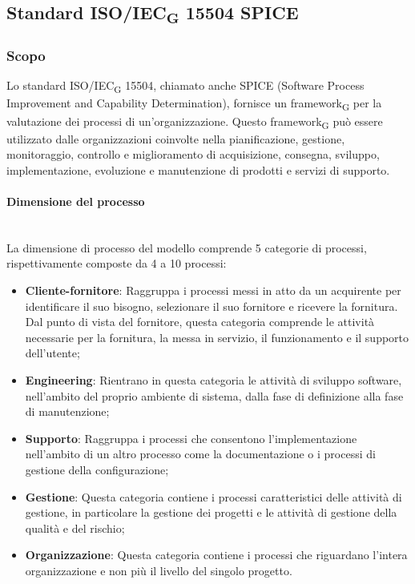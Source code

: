 \subsection{Standard ISO/IEC\textsubscript{G} 15504 SPICE}
\subsubsection{Scopo}
Lo standard ISO/IEC\textsubscript{G} 15504, chiamato anche SPICE (Software Process Improvement and Capability Determination), fornisce un framework\textsubscript{G} per la valutazione dei processi di un'organizzazione. Questo framework\textsubscript{G} può essere utilizzato dalle organizzazioni coinvolte nella pianificazione, gestione, monitoraggio, controllo e miglioramento di acquisizione, consegna, sviluppo, implementazione, evoluzione e manutenzione di prodotti e servizi di supporto.
\paragraph {Dimensione del processo}\mbox{}\\
La dimensione di processo del modello comprende 5 categorie di processi, rispettivamente composte da 4 a 10 processi:
\begin{itemize}
	\item \textbf{Cliente-fornitore}: Raggruppa i processi messi in atto da un acquirente per identificare il suo bisogno, selezionare il suo fornitore e ricevere la fornitura. Dal punto di vista del fornitore, questa categoria comprende le attività necessarie per la fornitura, la messa in servizio, il funzionamento e il supporto dell'utente;
	\item \textbf{Engineering}: Rientrano in questa categoria le attività di sviluppo software, nell'ambito del proprio ambiente di sistema, dalla fase di definizione alla fase di manutenzione;
	\item \textbf{Supporto}: Raggruppa i processi che consentono l'implementazione nell'ambito di un altro processo come la documentazione o i processi di gestione della configurazione;
	\item \textbf{Gestione}: Questa categoria contiene i processi caratteristici delle attività di gestione, in particolare la gestione dei progetti e le attività di gestione della qualità e  del rischio;
	\item \textbf{Organizzazione}: Questa categoria contiene i processi che riguardano l'intera organizzazione e non più il livello del singolo progetto.
\end{itemize}
